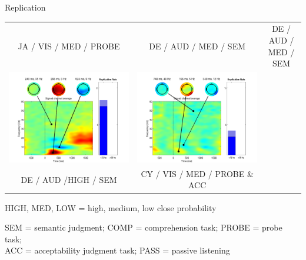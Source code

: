 \documentclass[final]{beamer}
\begin{document}
\begin{frame}{}
\begin{textblock}{63}
\begin{block}{Replication}
\begin{tabular}{c c c}
JA / VIS / MED / PROBE & DE / AUD / MED / SEM  & DE / AUD / MED / SEM \\
\includegraphics{gamma10} & \includegraphics{gamma11} &  \\
DE / AUD /HIGH / SEM & CY / VIS / MED / PROBE \& ACC &  \\
\end{tabular}
\end{block}
HIGH, MED, LOW = high, medium, low close probability 

SEM = semantic judgment; COMP = comprehension task; PROBE = probe task; \\ ACC = acceptability judgment task; PASS = passive listening 
\end{textblock}


\end{frame}
\end{document}
